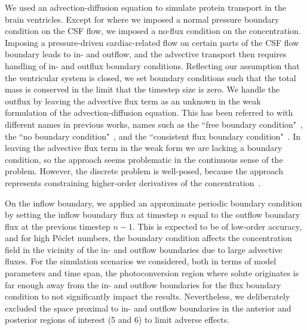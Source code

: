 \documentclass[fleqn]{wlscirep}
\begin{document}
We used an advection-diffusion equation to simulate protein transport in the brain ventricles.
Except for where we imposed a normal pressure boundary condition on the CSF flow,
we imposed a no-flux condition on the concentration. Imposing a pressure-driven
cardiac-related flow on certain parts of the CSF flow boundary leads to in- and outflow,
and the advective transport then requires handling of in- and outflux boundary conditions.
Reflecting our assumption that the ventricular system is closed, we set boundary conditions such
that the total mass is conserved in the limit that the timestep size is zero.
We handle the outflux by leaving the advective flux term as an unknown in the weak formulation
of the advection-diffusion equation. This has been referred to with different names in previous works,
names such as the ``free boundary condition"~\cite{Papanastasiou1992ACondition},
the ``no boundary condition"~\cite{Griffiths1997TheCondition}, and the 
``consistent flux boundary condition"~\cite{Lynch2020NumericalHemodynamics}. 
In leaving the advective flux term in the weak form we are lacking a boundary condition,
so the approach seems problematic in the continuous sense of the problem.
However, the discrete problem is well-posed, because the approach represents
constraining higher-order derivatives of the concentration~\cite{Griffiths1997TheCondition}. 

On the inflow boundary, we applied an approximate periodic boundary condition by setting
the inflow boundary flux at timestep $n$ equal to the outflow boundary flux at the previous
timestep $n-1$. This is expected to be of low-order accuracy, and for high Péclet numbers,
the boundary condition affects the concentration field in the vicinity of the in- and outflow boundaries
due to large advective fluxes. For the simulation scenarios we considered, both in terms of model parameters
and time span, the photoconversion region where solute originates is far enough away from the in- and outflow
boundaries for the flux boundary condition to not significantly impact the results. Nevertheless,
we deliberately excluded the space proximal to in- and outflow boundaries in
the anterior and posterior regions of interest (5 and 6) to limit adverse effects. 
\end{document}
